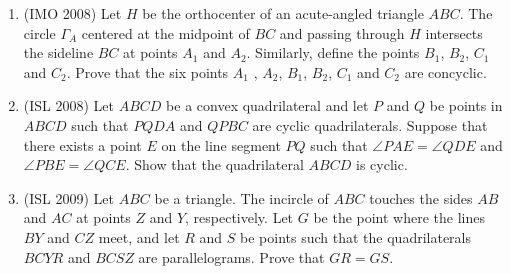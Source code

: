 \documentclass[11pt]{article}
\begin{document}
\begin{enumerate}
\item (IMO 2008) Let $ H$ be the orthocenter of an acute-angled triangle $ ABC$. The circle $ \Gamma_{A}$ centered at the midpoint of $ BC$ and passing through $ H$ intersects the sideline $ BC$ at points  $ A_{1}$ and $ A_{2}$. Similarly, define the points $ B_{1}$, $ B_{2}$, $ C_{1}$ and $ C_{2}$. Prove that the six points $ A_{1}$ , $ A_{2}$, $ B_{1}$, $ B_{2}$, $ C_{1}$ and $ C_{2}$ are concyclic. 


\item (ISL 2008) Let $ ABCD$ be a convex quadrilateral and let $ P$ and $ Q$ be points in $ ABCD$ such that $ PQDA$ and $ QPBC$ are cyclic quadrilaterals. Suppose that there exists a point $ E$ on the line segment $ PQ$ such that $ \angle PAE = \angle QDE$ and $ \angle PBE = \angle QCE$. Show that the quadrilateral $ ABCD$ is cyclic. 

\item (ISL 2009) Let $ABC$ be a triangle. The incircle of $ABC$ touches the sides $AB$ and $AC$ at points $Z$ and $Y$, respectively. Let $G$ be the point where the lines $BY$ and $CZ$ meet, and let $R$ and $S$ be points such that the quadrilaterals $BCYR$ and $BCSZ$ are parallelograms. Prove that $GR=GS$.


\end{enumerate}

\end{document}
